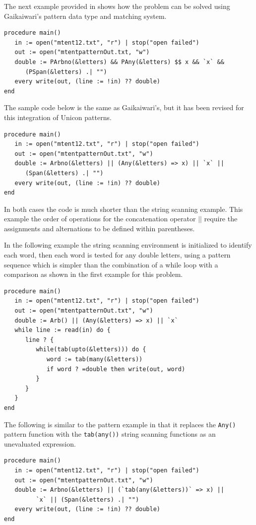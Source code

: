 \documentclass{article}
\begin{document}
The next example provided in \cite{Gaikaiwari2005} shows how the problem can be solved using Gaikaiwari's pattern data type and matching system.  
\begin{verbatim}
procedure main()
   in := open("mtent12.txt", "r") | stop("open failed")
   out := open("mtentpatternOut.txt, "w")
   double := PArbno(&letters) && PAny(&letters) $$ x && `x` && 
      (PSpan(&letters) .| "")
   every write(out, (line := !in) ?? double)
end
\end{verbatim}

The sample code below is the same as Gaikaiwari's, but it has been revised for this integration of Unicon patterns.
\begin{verbatim}
procedure main()
   in := open("mtent12.txt", "r") | stop("open failed")
   out := open("mtentpatternOut.txt", "w")
   double := Arbno(&letters) || (Any(&letters) => x) || `x` ||
      (Span(&letters) .| "")
   every write(out, (line := !in) ?? double)
end 
\end{verbatim}
In both cases the code is much shorter than the string scanning example.  This example the order of operations for the concatenation operator \texttt{$||$} require the assignments and alternations to be defined within parentheses.  

In the following example the string scanning environment is initialized to identify each word, then each word is tested for any double letters, using a pattern sequence which is simpler than the combination of a while loop with a comparison as shown in the first example for this problem.
\begin{verbatim}
procedure main()
   in := open("mtent12.txt", "r") | stop("open failed")
   out := open("mtentpatternOut.txt", "w")
   double := Arb() || (Any(&letters) => x) || `x`
   while line := read(in) do {
      line ? {
         while(tab(upto(&letters))) do {
            word := tab(many(&letters))
            if word ? =double then write(out, word)
         }
      }
   }
end 
\end{verbatim}

The following is similar to the pattern example in that it replaces the \texttt{Any()} pattern function with the \texttt{tab(any())} string scanning functions as an unevaluated expression.
\begin{verbatim}
procedure main()
   in := open("mtent12.txt", "r") | stop("open failed")
   out := open("mtentpatternOut.txt", "w")
   double := Arbno(&letters) || (`tab(any(&letters))` => x) ||
         `x` || (Span(&letters) .| "")
   every write(out, (line := !in) ?? double)
end 
\end{verbatim}
\end{document}
